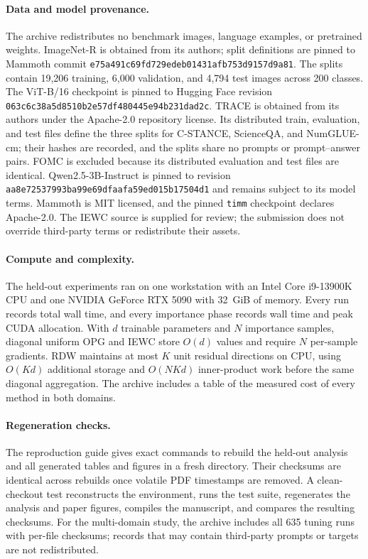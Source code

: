 \paragraph{Data and model provenance.}
The archive redistributes no benchmark images, language examples, or pretrained
weights. ImageNet-R is obtained from its authors; split definitions are pinned
to Mammoth commit \texttt{e75a491c69fd729edeb01431afb753d9157d9a81}.
The splits contain 19,206 training, 6,000 validation, and 4,794 test images
across 200 classes. The ViT-B/16 checkpoint is pinned to Hugging Face
revision \texttt{063c6c38a5d8510b2e57df480445e94b231dad2c}. TRACE is obtained
from its authors under the Apache-2.0 repository license. Its distributed
train, evaluation, and test files define the three splits for C-STANCE,
ScienceQA, and NumGLUE-cm; their hashes are recorded, and the splits share no
prompts or prompt--answer pairs. FOMC is excluded because its distributed
evaluation and test files are identical. Qwen2.5-3B-Instruct is pinned to
revision \texttt{aa8e72537993ba99e69dfaafa59ed015b17504d1} and remains subject
to its model terms. Mammoth is MIT licensed, and the pinned \texttt{timm}
checkpoint declares Apache-2.0. The IEWC source is supplied for review;
the submission does not override third-party terms or redistribute their
assets.

\paragraph{Compute and complexity.}
The held-out experiments ran on one workstation with an Intel Core
i9-13900K CPU and one NVIDIA GeForce RTX 5090 with 32~GiB of memory. Every run
records total wall time, and every importance phase records wall time and peak
CUDA allocation. With $d$ trainable parameters and $N$ importance samples,
diagonal uniform OPG and IEWC store $O(d)$ values and require $N$
per-sample gradients. RDW maintains at most $K$ unit residual directions on
CPU, using $O(Kd)$ additional storage and $O(NKd)$ inner-product work before
the same diagonal aggregation. The archive includes a table of the measured
cost of every method in both domains.

\paragraph{Regeneration checks.}
The reproduction guide gives exact commands to rebuild the held-out analysis
and all generated tables and figures in a fresh directory. Their checksums are
identical across rebuilds once volatile PDF timestamps are removed. A
clean-checkout test reconstructs the environment, runs the test suite,
regenerates the analysis and paper figures, compiles the manuscript, and
compares the resulting checksums. For the multi-domain study, the archive
includes all 635 tuning runs with per-file checksums;
records that may contain third-party prompts or targets are not
redistributed.
